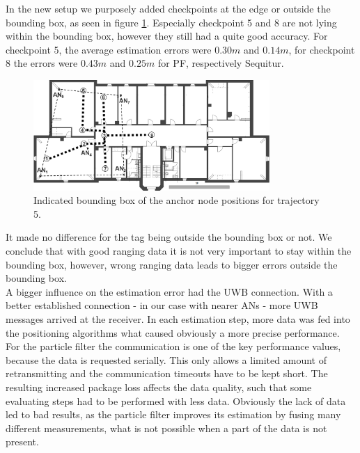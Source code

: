 In the new setup we purposely added checkpoints at the edge or outside the bounding box, as seen in figure \ref{fig:trajectory5_boundingBox}. Especially checkpoint 5 and 8 are not lying within the bounding box, however they still had a quite good accuracy. For checkpoint 5, the average estimation errors were $0.30m$ and $0.14m$, for checkpoint 8 the errors were $0.43m$ and $0.25m$ for PF, respectively Sequitur.
\begin{figure}[th]
\centering
\includegraphics[width=0.8\textwidth]{Figures/trajectory5_boundingBox}
\decoRule
\caption[Trajectory 5 with Bounding Box]{Indicated bounding box of the anchor node positions for trajectory 5.}
\label{fig:trajectory5_boundingBox}
\end{figure}
It made no difference for the tag being outside the bounding box or not. We conclude that with good ranging data it is not very important to stay within the bounding box, however, wrong ranging data leads to bigger errors outside the bounding box.\\
\noindent\hspace*{5mm}%
A bigger influence on the estimation error had the UWB connection. With a better established connection - in our case with nearer ANs - more UWB messages arrived at the receiver. In each estimation step, more data was fed into the positioning algorithms what caused obviously a more precise performance. For the particle filter the communication is one of the key performance values, because the data is requested serially. This only allows a limited amount of retransmitting and the communication timeouts have to be kept short. The resulting increased package loss affects the data quality, such that some evaluating steps had to be performed with less data. Obviously the lack of data led to bad results, as the particle filter improves its estimation by fusing many different measurements, what is not possible when a part of the data is not present.